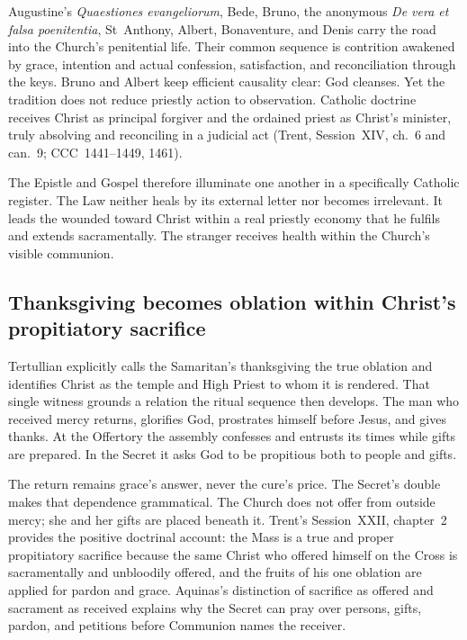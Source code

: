 Augustine's \emph{Quaestiones evangeliorum}, Bede, Bruno, the anonymous
\emph{De vera et falsa poenitentia}, St~Anthony, Albert, Bonaventure, and Denis
carry the road into the Church's penitential life. Their common sequence is
contrition awakened by grace, intention and actual confession, satisfaction,
and reconciliation through the keys. Bruno and Albert keep efficient causality
clear: God cleanses. Yet the tradition does not reduce priestly action to
observation. Catholic doctrine receives Christ as principal forgiver and the
ordained priest as Christ's minister, truly absolving and reconciling in a
judicial act (Trent, Session~XIV, ch.~6 and can.~9; CCC~1441--1449, 1461).

The Epistle and Gospel therefore illuminate one another in a specifically
Catholic register. The Law neither heals by its external letter nor becomes
irrelevant. It leads the wounded toward Christ within a real priestly economy
that he fulfils and extends sacramentally. The stranger receives health within
the Church's visible communion.

\subsection*{Thanksgiving becomes oblation within Christ's propitiatory sacrifice\enspace
  }

Tertullian explicitly calls the Samaritan's thanksgiving the true oblation and
identifies Christ as the temple and High Priest to whom it is rendered. That
single witness grounds a relation the ritual sequence then develops. The man
who received mercy returns, glorifies God, prostrates himself before Jesus, and
gives thanks. At the Offertory the assembly confesses 
and entrusts its times while gifts are prepared. In the Secret it asks God to
be propitious both to people and gifts.

The return remains grace's answer, never the cure's price. The Secret's double
 makes that dependence grammatical. The Church does not
offer from outside mercy; she and her gifts are placed beneath it. Trent's
Session~XXII, chapter~2 provides the positive doctrinal account: the Mass is a
true and proper propitiatory sacrifice because the same Christ who offered
himself on the Cross is sacramentally and unbloodily offered, and the fruits of
his one oblation are applied for pardon and grace. Aquinas's distinction of
sacrifice as offered and sacrament as received explains why the Secret can
pray over persons, gifts, pardon, and petitions before Communion names the
receiver.

